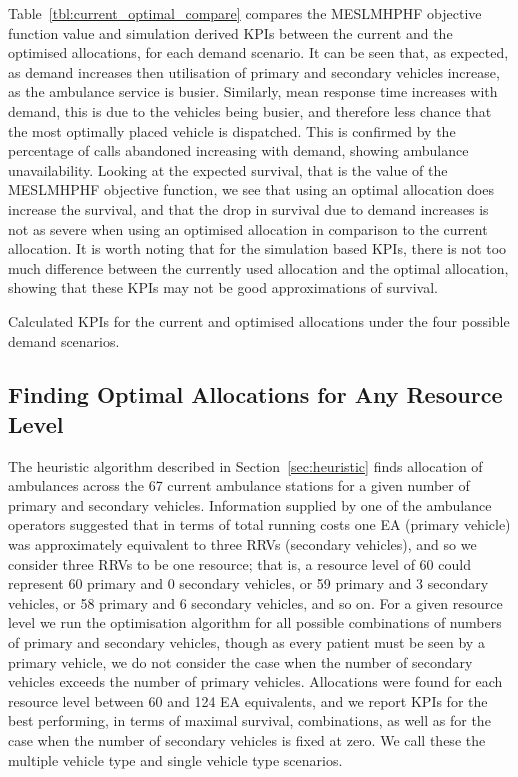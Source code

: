 \documentclass[preprint,12pt]{elsarticle}
\begin{document}
Table~\ref{tbl:current_optimal_compare} compares the MESLMHPHF objective
function value and simulation derived KPIs between the current and the optimised
allocations, for each demand scenario. It can be seen that, as expected, as
demand increases then utilisation of primary and secondary vehicles increase, as
the ambulance service is busier. Similarly, mean response time increases with
demand, this is due to the vehicles being busier, and therefore less chance that
the most optimally placed vehicle is dispatched. This is confirmed by the
percentage of calls abandoned increasing with demand, showing ambulance
unavailability.
Looking at the expected survival, that is the value of the MESLMHPHF objective
function, we see that using an optimal allocation does increase the survival,
and that the drop in survival due to demand increases is not as severe when
using an optimised allocation in comparison to the current allocation.
It is worth noting that for the simulation based KPIs, there is not too much
difference between the currently used allocation and the optimal allocation,
showing that these KPIs may not be good approximations of survival.

\begin{table}
\begin{center}
\resizebox{\textwidth}{!}{%
%
}
\caption{Calculated KPIs for the current and optimised allocations under the
four possible demand scenarios.}
\label{tbl:current_optimal_compare}
\end{center}
\end{table}


\subsection{Finding Optimal Allocations for Any Resource Level}\label{sec:vehicle_numbers}
The heuristic algorithm described in Section~\ref{sec:heuristic} finds
allocation of ambulances across the 67 current ambulance stations for a given
number of primary and secondary vehicles. Information supplied by one of the
ambulance operators suggested that in terms of total running costs one EA
(primary vehicle) was approximately equivalent to three RRVs (secondary
vehicles), and so we consider three RRVs to be one resource; that is, a
resource level of 60 could represent 60 primary and 0 secondary vehicles, or
59 primary and 3 secondary vehicles, or 58 primary and 6 secondary vehicles,
and so on. For a given resource level we run the optimisation algorithm for
all possible combinations of numbers of primary and secondary vehicles, though
as every patient must be seen by a primary vehicle, we do not consider the
case when the number of secondary vehicles exceeds the number of primary
vehicles.
Allocations were found for each resource level between 60 and 124 EA
equivalents, and we report KPIs for the best performing, in terms of maximal
survival, combinations, as well as for the case when the number of secondary
vehicles is fixed at zero. We call these the multiple vehicle type and single
vehicle type scenarios.
\end{document}
